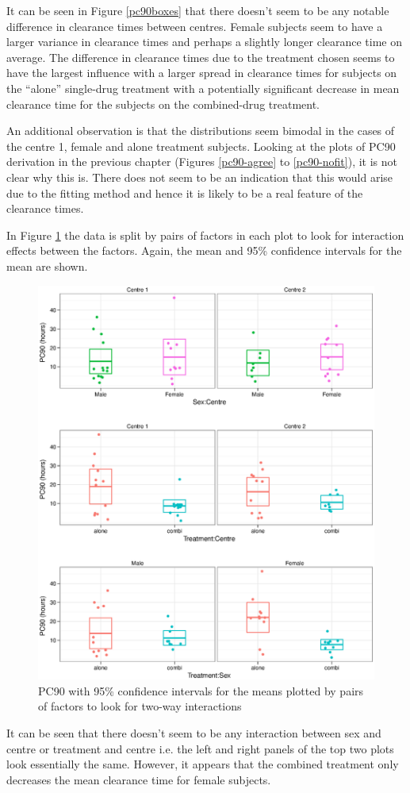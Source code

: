 It can be seen in Figure \ref{pc90boxes} that there doesn't seem to be any notable difference in clearance times between centres. Female subjects seem to have a larger variance in clearance times and perhaps a slightly longer clearance time on average. The difference in clearance times due to the treatment chosen seems to have the largest influence with a larger spread in clearance times for subjects on the ``alone'' single-drug treatment with a potentially significant decrease in mean clearance time for the subjects on the combined-drug treatment.

An additional observation is that the distributions seem bimodal in the cases of the centre 1, female and alone treatment subjects. Looking at the plots of PC90 derivation in the previous chapter (Figures \ref{pc90-agree} to \ref{pc90-nofit}), it is not clear why this is. There does not seem to be an indication that this would arise due to the fitting method and hence it is likely to be a real feature of the clearance times.

In Figure \ref{pc90interaction} the data is split by pairs of factors in each plot to look for interaction effects between the factors. Again, the mean and 95\% confidence intervals for the mean are shown.
\begin{figure}[h]
\includegraphics[width=150mm]{pc90interaction.eps} 
\caption{PC90 with 95\% confidence intervals for the means plotted by pairs of factors to look for two-way interactions}
\label{pc90interaction}
\end{figure}
It can be seen that there doesn't seem to be any interaction between sex and centre or treatment and centre i.e. the left and right panels of the top two plots look essentially the same. However, it appears that the combined treatment only decreases the mean clearance time for female subjects.
\clearpage

